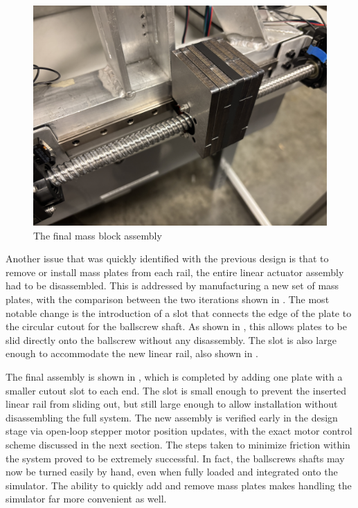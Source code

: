 \begin{figure}[p]
    \centering
    \includegraphics[width=0.85\linewidth]{figures/completed_block.jpg}
    \caption{The final mass block assembly}
    \label{fig:completed_block}
\end{figure}


Another issue that was quickly identified with the previous design is that to remove or install mass plates from each rail, the entire linear actuator assembly had to be disassembled. This is addressed by manufacturing a new set of mass plates, with the comparison between the two iterations shown in . The most notable change is the introduction of a slot that connects the edge of the plate to the circular cutout for the ballscrew shaft. As shown in , this allows plates to be slid directly onto the ballscrew without any disassembly. The slot is also large enough to accommodate the new linear rail, also shown in . 

The final assembly is shown in , which is completed by adding one plate with a smaller cutout slot to each end. The slot is small enough to prevent the inserted linear rail from sliding out, but still large enough to allow installation without disassembling the full system. The new assembly is verified early in the design stage via open-loop stepper motor position updates, with the exact motor control scheme discussed in the next section. The steps taken to minimize friction within the system proved to be extremely successful. In fact, the ballscrews shafts may now be turned easily by hand, even when fully loaded and integrated onto the simulator. The ability to quickly add and remove mass plates makes handling the simulator far more convenient as well.

